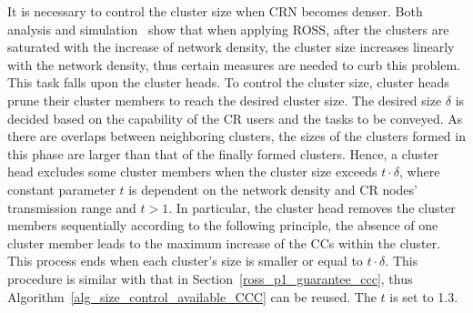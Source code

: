 \documentclass[times]{ettauth}
\theoremstyle{mytheoremstyle}
\theoremstyle{mytheoremstyle}
\theoremstyle{mytheoremstyle}
\begin{document}
%
It is necessary to control the cluster size when CRN becomes denser.
Both analysis and simulation~\cite{robust_clustering_arxiv} show that when applying ROSS, after the clusters are saturated with the increase of network density, the cluster size increases linearly with the network density, thus certain measures are needed to curb this problem.
This task falls upon the cluster heads.
To control the cluster size, cluster heads prune their cluster members to reach the desired cluster size.
The desired size $\delta$ is decided based on the capability of the CR users and the tasks to be conveyed.
As there are overlaps between neighboring clusters, the sizes of the clusters formed in this phase are larger than that of the finally formed clusters.
Hence, a cluster head excludes some cluster members when the cluster size exceeds $t\cdot \delta$, where constant parameter $t$ is dependent on the network density and CR nodes' transmission range and $t>1$.
In particular, the cluster head removes the cluster members sequentially according to the following principle, the absence of one cluster member leads to the maximum increase of the CCs within the cluster.
This process ends when each cluster's size is smaller or equal to $t \cdot\delta$.
This procedure is similar with that in Section~\ref{ross_p1_guarantee_ccc}, thus Algorithm~\ref{alg_size_control_available_CCC} can be reused.
The $t$ is set to 1.3. 	
\end{document}
